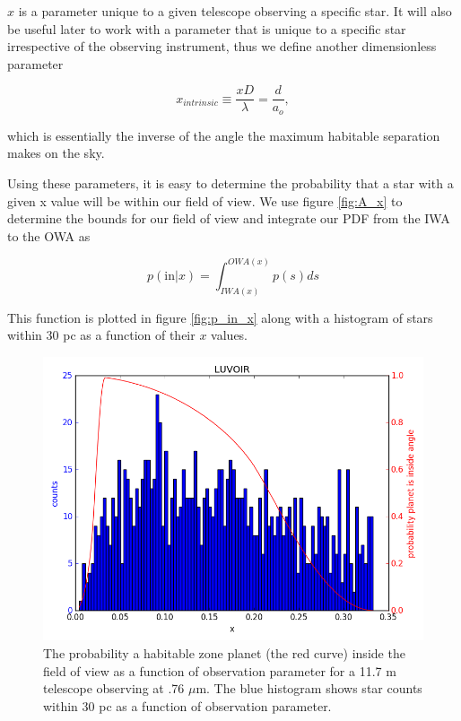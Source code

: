 \documentclass{article}
\begin{document}
	$x$ is a parameter unique to a given telescope observing a specific star. It will also be useful later to work with a parameter that is unique to a specific star irrespective of the observing instrument, thus we define another dimensionless parameter 
	
	\begin{equation}
	x_{intrinsic} \equiv \frac{x D}{\lambda} = \frac{d}{a_o},
	\end{equation}
	
	which is essentially the inverse of the angle the maximum habitable separation makes on the sky. 
	
	Using these parameters, it is easy to determine the probability that a star with a given x value will be within our field of view. We use figure \ref{fig:A_x} to determine the bounds for our field of view and integrate our PDF from the IWA to the OWA as
	
	\begin{equation}
	p(\mbox{in} | x) = \int^{OWA(x)}_{IWA(x)} p(s) ds
	\end{equation}
	
	This function is plotted in figure \ref{fig:p_in_x} along with a histogram of stars within 30 pc as a function of their $x$ values. 
	
	\begin{figure}
		\includegraphics[width = \linewidth]{LUVOIR_planet_expect.png}
		\caption{The probability a habitable zone planet (the red curve) inside the field of view as a function of observation parameter for a 11.7 m telescope observing at .76 $\mu$m. The blue histogram shows star counts within 30 pc as a function of observation parameter.}
		\label{fig:P_x_LUVOIR}
	\end{figure}
	
\end{document}
